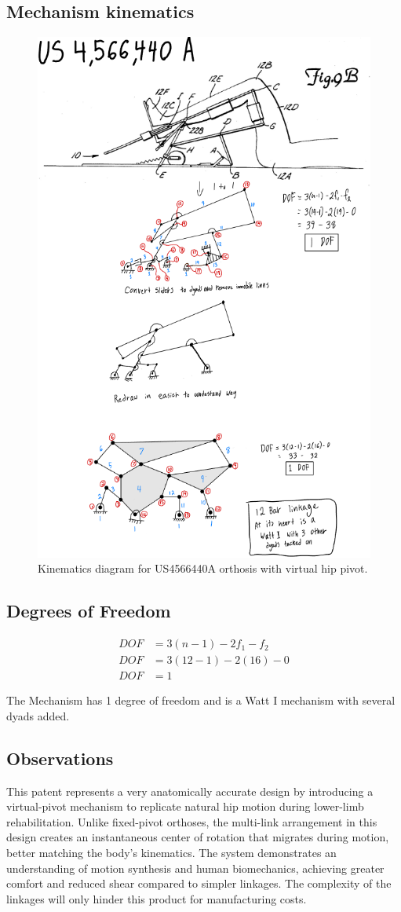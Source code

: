\documentclass[11pt]{article}
\begin{document}
\subsection{Mechanism kinematics}
\begin{figure}[H]
  \centering
  \includegraphics[width=0.54\linewidth]{../Kinematic Mechanism Images/4566440.png}
  \caption{Kinematics diagram for US4566440A orthosis with virtual hip pivot.}
  \label{fig:US4566440A_kinematics}
\end{figure}

\subsection{Degrees of Freedom}
\[
\begin{aligned}
DOF &= 3(n-1) - 2f_1 - f_2 \\
DOF &= 3(12-1) - 2(16) - 0 \\
DOF &= 1
\end{aligned}
\]

The Mechanism has 1 degree of freedom and is a Watt I mechanism with several dyads added.

\subsection{Observations}
This patent represents a very anatomically accurate design by introducing a virtual-pivot mechanism to replicate natural hip motion during lower-limb rehabilitation. Unlike fixed-pivot orthoses, the multi-link arrangement in this design creates an instantaneous center of rotation that migrates during motion, better matching the body's kinematics. The system demonstrates an understanding of motion synthesis and human biomechanics, achieving greater comfort and reduced shear compared to simpler linkages. The complexity of the linkages will only hinder this product for manufacturing costs.
\end{document}
